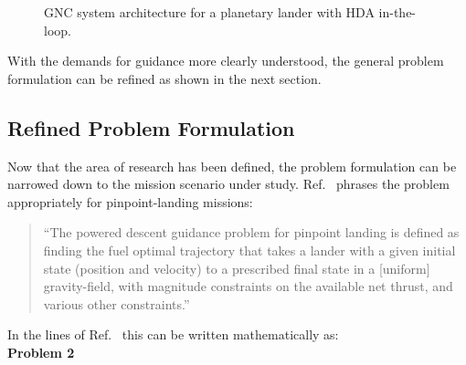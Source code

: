 \documentclass[%
]{aiaa-tc}
\begin{document}
\begin{figure}
    \caption{GNC system architecture for a planetary lander with HDA
        in-the-loop.}
    \label{fig:arch}
\end{figure}


With the demands for guidance more clearly understood, the general problem
formulation can be refined as shown in the next section.


\subsection{Refined Problem Formulation}

Now that the area of research has been defined, the problem formulation can be
narrowed down to the mission scenario under study. Ref.~
phrases the problem appropriately for pinpoint-landing missions:

\begin{quote}
    ``The powered descent guidance problem for pinpoint landing is defined as
    finding the fuel optimal trajectory that takes a lander with a given initial
    state (position and velocity) to a prescribed final state in a [uniform]
    gravity-field, with magnitude constraints on the available net thrust, and
    various other constraints.''%
\end{quote}

In the lines of Ref.~ this can be written mathematically
as:\\

\noindent \textbf{Problem 2} 
\end{document}
